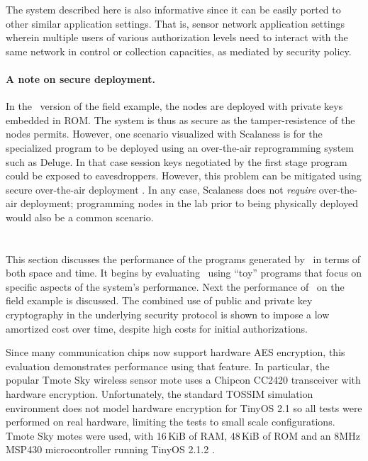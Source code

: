 The system described here is also informative since it can be easily ported to other similar
application settings. That is, sensor network application settings wherein multiple users of
various authorization levels need to interact with the same network in control or collection
capacities, as mediated by security policy.

\paragraph{A note on secure deployment.} In the \Sprocket\ version of the field example, the
nodes are deployed with private keys embedded in ROM. The system is thus as secure as the
tamper-resistence of the nodes permits. However, one scenario visualized with Scalaness is for
the specialized program to be deployed using an over-the-air reprogramming system such as
Deluge. In that case session keys negotiated by the first stage program could be exposed to
eavesdroppers. However, this problem can be mitigated using secure over-the-air deployment
\cite{Dutta:2006:SDN:1127777.1127826}. In any case, Scalaness does not \emph{require}
over-the-air deployment; programming nodes in the lab prior to being physically deployed would
also be a common scenario.

\section{\Sprocket}
\label{section-sprocket-evaluation}

This section discusses the performance of the programs generated by \Sprocket\ in terms of both
space and time. It begins by evaluating \Sprocket\ using ``toy'' programs that focus on specific
aspects of the system's performance. Next the performance of \Sprocket\ on the field example is
discussed. The combined use of public and private key cryptography in the underlying security
protocol is shown to impose a low amortized cost over time, despite high costs for initial
authorizations.

Since many communication chips now support hardware AES encryption, this evaluation demonstrates
performance using that feature. In particular, the popular Tmote Sky wireless sensor mote
\cite{tmotesky-datasheet} uses a Chipcon CC2420 transceiver with hardware encryption.
Unfortunately, the standard TOSSIM simulation environment does not model hardware encryption for
TinyOS 2.1 so all tests were performed on real hardware, limiting the tests to small scale
configurations. Tmote Sky motes were used, with 16\,KiB of RAM, 48\,KiB of ROM and an 8MHz
MSP430 microcontroller running TinyOS 2.1.2 \cite{tinyos}.


